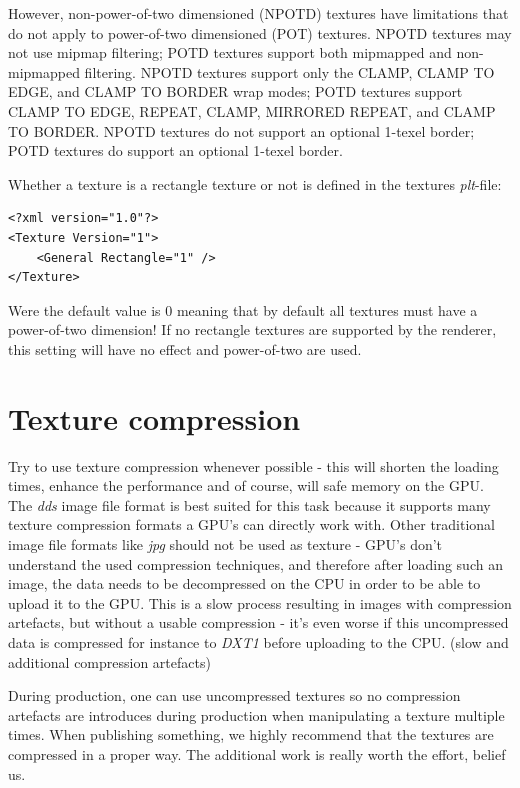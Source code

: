 However, non-power-of-two dimensioned (NPOTD) textures have limitations that do not apply to power-of-two dimensioned (POT) textures. NPOTD textures may not use mipmap filtering; POTD textures support both mipmapped and non-mipmapped filtering. NPOTD textures support only the CLAMP, CLAMP TO EDGE, and CLAMP TO BORDER wrap modes; POTD textures support CLAMP TO EDGE, REPEAT, CLAMP, MIRRORED REPEAT, and CLAMP TO BORDER. NPOTD textures do not support an optional 1-texel border;
POTD textures do support an optional 1-texel border.

Whether a texture is a rectangle texture or not is defined in the textures \emph{plt}-file:

\begin{lstlisting}[caption=\emph{plt}-file rectangle texture setup]
<?xml version="1.0"?>
<Texture Version="1">
    <General Rectangle="1" />
</Texture>
\end{lstlisting}

Were the default value is 0 meaning that by default all textures must have a power-of-two dimension! If no rectangle textures are supported by the renderer, this setting will have no effect and power-of-two are used.




\section{Texture compression}
Try to use texture compression whenever possible - this will shorten the loading times, enhance the performance and of course, will safe memory on the GPU. The \emph{dds} image file format is best suited for this task because it supports many texture compression formats a GPU's can directly work with. Other traditional image file formats like \emph{jpg} should not be used as texture - GPU's don't understand the used compression techniques, and therefore after loading such an image, the data needs to be decompressed on the CPU in order to be able to upload it to the GPU. This is a slow process resulting in images with compression artefacts, but without a usable compression - it's even worse if this uncompressed data is compressed for instance to \emph{DXT1} before uploading to the CPU. (slow and additional compression artefacts)

During production, one can use uncompressed textures so no compression artefacts are introduces during production when manipulating a texture multiple times. When publishing something, we highly recommend that the textures are compressed in a proper way. The additional work is really worth the effort, belief us.



